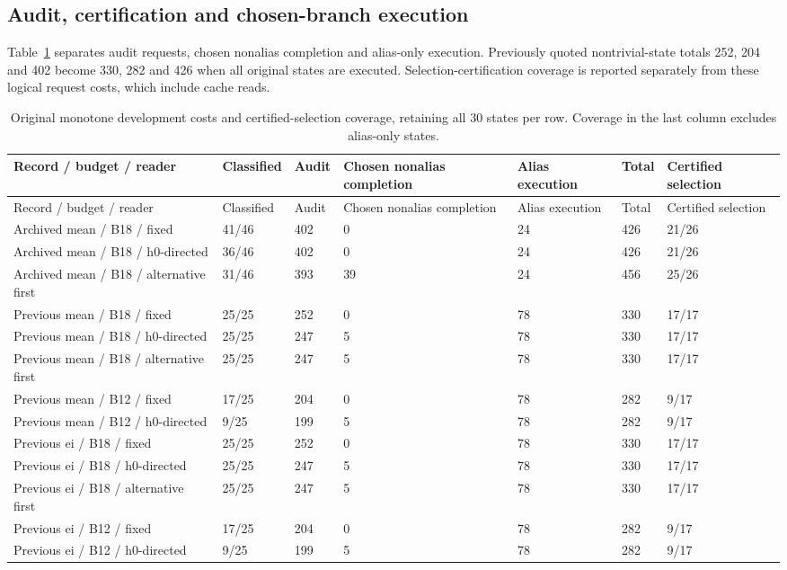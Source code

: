 \subsection{Audit, certification and chosen-branch execution}
Table~\ref{tab:reconciled_costs} separates audit requests, chosen nonalias completion and alias-only execution. Previously quoted nontrivial-state totals 252, 204 and 402 become 330, 282 and 426 when all original states are executed. Selection-certification coverage is reported separately from these logical request costs, which include cache reads.

\FloatBarrier\begingroup\fontsize{8.5}{10.5}\selectfont\setlength\tabcolsep{3pt}
\begin{longtable}{@{}p{}p{.12\linewidth}p{.10\linewidth}p{.12\linewidth}p{.10\linewidth}p{.10\linewidth}p{.15\linewidth}@{}}
\caption{Original monotone development costs and certified-selection coverage, retaining all 30 states per row. Coverage in the last column excludes alias-only states.}\label{tab:reconciled_costs}\\
\toprule Record / budget / reader & Classified & Audit & Chosen nonalias completion & Alias execution & Total & Certified selection \\
\midrule\endfirsthead\toprule Record / budget / reader & Classified & Audit & Chosen nonalias completion & Alias execution & Total & Certified selection \\
\midrule\endhead\bottomrule\endlastfoot
Archived mean / B18 / fixed & 41/46 & 402 & 0 & 24 & 426 & 21/26 \\
Archived mean / B18 / h0-directed & 36/46 & 402 & 0 & 24 & 426 & 21/26 \\
Archived mean / B18 / alternative first & 31/46 & 393 & 39 & 24 & 456 & 25/26 \\
Previous mean / B18 / fixed & 25/25 & 252 & 0 & 78 & 330 & 17/17 \\
Previous mean / B18 / h0-directed & 25/25 & 247 & 5 & 78 & 330 & 17/17 \\
Previous mean / B18 / alternative first & 25/25 & 247 & 5 & 78 & 330 & 17/17 \\
Previous mean / B12 / fixed & 17/25 & 204 & 0 & 78 & 282 & 9/17 \\
Previous mean / B12 / h0-directed & 9/25 & 199 & 5 & 78 & 282 & 9/17 \\
Previous ei / B18 / fixed & 25/25 & 252 & 0 & 78 & 330 & 17/17 \\
Previous ei / B18 / h0-directed & 25/25 & 247 & 5 & 78 & 330 & 17/17 \\
Previous ei / B18 / alternative first & 25/25 & 247 & 5 & 78 & 330 & 17/17 \\
Previous ei / B12 / fixed & 17/25 & 204 & 0 & 78 & 282 & 9/17 \\
Previous ei / B12 / h0-directed & 9/25 & 199 & 5 & 78 & 282 & 9/17 \\
\end{longtable}\endgroup

